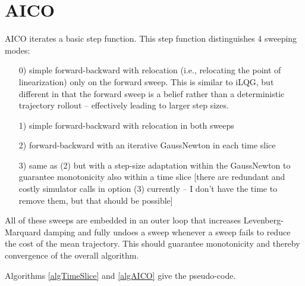 \section{AICO}

AICO iterates a basic step function. This step function distinguishes
4 sweeping modes:
\begin{enumerate}
\item[0)] simple forward-backward with relocation (i.e., relocating the point
of linearization) only on the forward sweep. This is similar to
iLQG, but different in that the forward sweep is a belief rather
than a deterministic trajectory rollout -- effectively leading to larger step sizes.
\item[1)] simple forward-backward with relocation in both sweeps
\item[2)] forward-backward with an iterative GaussNewton in each time slice
\item[3)] same as (2) but with a step-size adaptation within the GaussNewton to
guarantee monotonicity also within a time slice [there are redundant and
costly simulator calls in option (3) currently -- I don't have the time
to remove them, but that should be possible]
\end{enumerate}

All of these sweeps are embedded in an outer loop that increases
Levenberg-Marquard damping and fully undoes a sweep whenever a sweep
fails to reduce the cost of the mean trajectory. This should guarantee
monotonicity and thereby convergence of the overall algorithm.

Algorithms \ref{algTimeSlice} and \ref{algAICO} give the pseudo-code.

